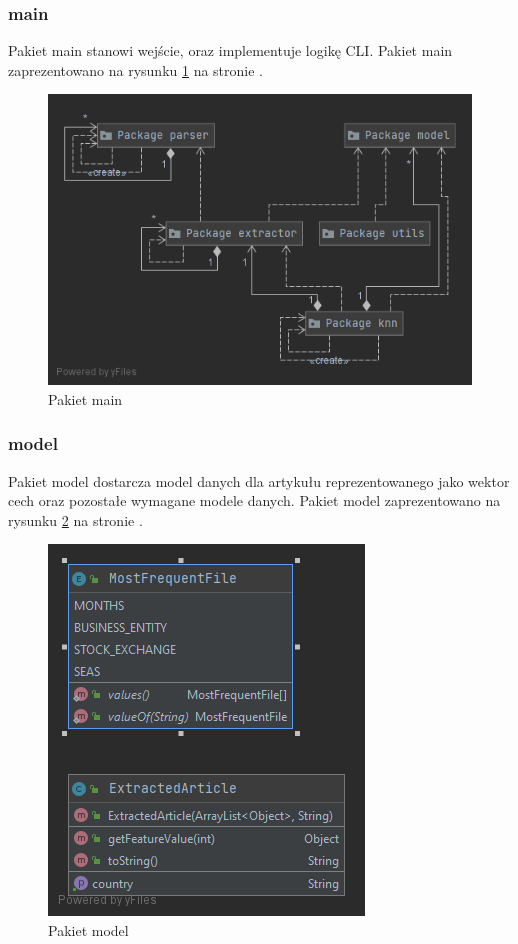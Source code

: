 \documentclass{classrep}
\begin{document}
\subsubsection{main}
Pakiet main stanowi wejście, oraz implementuje logikę CLI. Pakiet main zaprezentowano na rysunku \ref{main} na stronie \pageref{main}.

\begin{figure}[H]
\label{main}
\includegraphics[scale=0.5]{Package main}
\caption{Pakiet main}
\end{figure}


\subsubsection{model}
Pakiet model dostarcza model danych dla artykułu reprezentowanego jako wektor cech oraz pozostałe wymagane modele danych. Pakiet model zaprezentowano na rysunku \ref{mdl} na stronie \pageref{mdl}.

\begin{figure}[H]
\label{mdl}
\includegraphics[scale=0.5]{Package model}
\caption{Pakiet model}
\end{figure}
\end{document}
